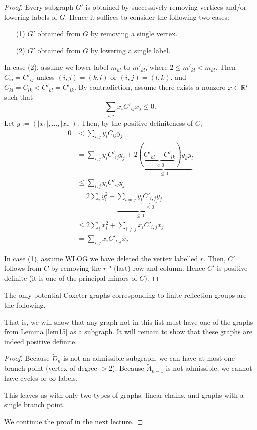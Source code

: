 \begin{proof}
Every subgraph $G'$ is obtained by successively removing vertices and/or
lowering labels of $G$. Hence it suffices to consider the following two cases:
\begin{enumerate}
\item[(1)] $G'$ obtained from $G$ by removing a single vertex.
\item[(2)] $G'$ obtained from $G$ by lowering a single label.
\end{enumerate}

In case (2), assume we lower label $m_{kl}$ to $m'_{kl}$, where
$2 \leq m'_{kl} < m_{kl}$. Then $C_{ij} = C'_{ij}$ unless $(i,j)=(k,l)$ or
$(i,j)=(l,k)$, and $C_{kl} = C_{lk} < C'_{kl} = C'_{lk}$. By contradiction,
assume there exists a nonzero $x \in \mathbb{R}^r$ such that
\[
    \sum_{i,j} x_i C'_{ij} x_j \leq 0.
\]
Let $y := (|x_1|, \dots, |x_r|)$. Then, by the positive definiteness of $C$,
\begin{align*}
    0 &< \sum_{i,j} y_i C_{ij} y_j \\
    &= \sum_{i,j} y_i C'_{ij} y_j +
    \underbrace{2( \underbrace{C'_{kl} - C'_{lk}}_{<0}) y_k y_l}_{\leq 0} \\
    &\leq \sum_{i,j} y_i C'_{ij} y_j \\
    &= 2 \sum_{i} y_i^2 +
    \underbrace{\sum_{i \neq j} y_i \underbrace{C'_{i,j}}_{\leq 0} y_j}_{\leq 0} \\
    &\leq 2 \sum_{i} x_i^2 +
    \sum_{i \neq j} x_i C'_{i,j} x_j \\
    &= \sum_{i,j} x_i C'_{i,j} x_j
\end{align*}

In case (1), assume WLOG we have deleted the vertex labelled $r$. Then,
$C'$ follows from $C$ by removing the $r^{\text{th}}$ (last) row and column.
Hence $C'$ is positive definite (it is one of the principal minors of $C$).
\end{proof}

\begin{proposition} \label{prop17}
The only potential Coxeter graphs corresponding to finite reflection groups are
the following.
\end{proposition}


That is, we will show that any graph not in this list must have one of the
graphs from Lemma \ref{lem15} as a subgraph. It will remain to show that these
graphs are indeed positive definite.

\begin{proof}
Because $\widetilde{D}_n$ is not an admissible subgraph, we can have at most
one branch point (vertex of degree $>2$).
Because $\widetilde{A}_{n-1}$ is not admissible, we cannot have cycles or
$\infty$ labels.

This leaves us with only two types of graphs: linear chains, and graphs with
a single branch point.

We continue the proof in the next lecture.
\end{proof}

